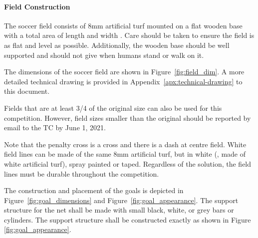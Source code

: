 \paragraph{Field Construction}
\label{sec:field_dim}


The soccer field consists of 8mm artificial turf mounted on a flat wooden base with a total area of length \TotalLength and width \TotalWidth.  Care should be taken to ensure the field is as flat and level as possible.  Additionally, the wooden base should be well supported and should not give when humans stand or walk on it.

The dimensions of the soccer field are shown in Figure~\ref{fig:field_dim}.
A more detailed technical drawing is provided in Appendix~\ref{apx:technical-drawing} to this document.

Fields that are at least 3/4 of the original size can also be used for this competition. However, field sizes smaller than the original should be reported by email to the TC by June 1, 2021.
 
Note that the penalty cross is a cross and there is a dash at centre field. White field lines can be made of the same 8mm artificial turf, but in white (\ie, made of white artificial turf), spray painted or taped. Regardless of the solution, the field lines must be durable throughout the competition.

The construction and placement of the goals is depicted in Figure~\ref{fig:goal_dimensions} and Figure~\ref{fig:goal_appearance}. The support structure for the net shall be made with small black, white, or grey bars or cylinders. The support structure shall be constructed exactly as shown in Figure \ref{fig:goal_appearance}.



